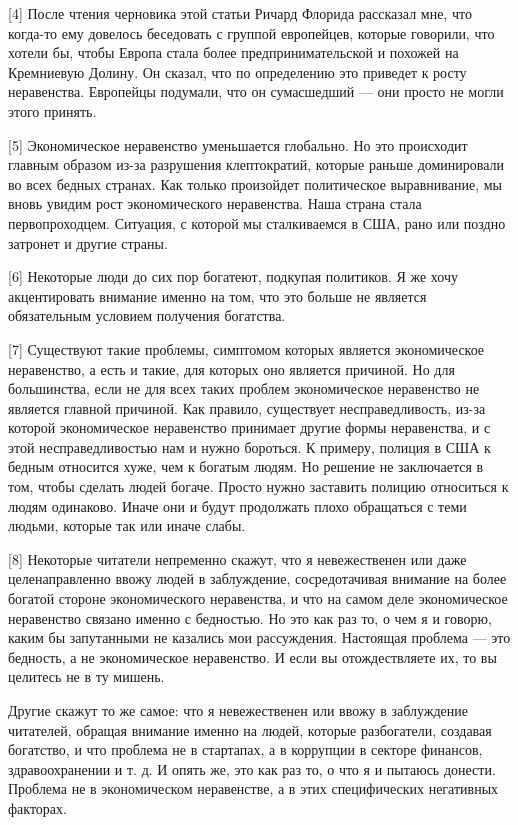 \documentclass[ebook,12pt,oneside,openany]{memoir}
\begin{document}
[4] После чтения черновика этой статьи Ричард Флорида рассказал мне,
что когда-то ему довелось беседовать с группой европейцев, которые
говорили, что хотели бы, чтобы Европа стала более предпринимательской
и похожей на Кремниевую Долину. Он сказал, что по определению это
приведет к росту неравенства. Европейцы подумали, что он сумасшедший —
они просто не могли этого принять.

[5] Экономическое неравенство уменьшается глобально. Но это происходит
главным образом из-за разрушения клептократий, которые раньше
доминировали во всех бедных странах. Как только произойдет
политическое выравнивание, мы вновь увидим рост экономического
неравенства. Наша страна стала первопроходцем. Ситуация, с которой мы
сталкиваемся в США, рано или поздно затронет и другие страны.

[6] Некоторые люди до сих пор богатеют, подкупая политиков. Я же хочу
акцентировать внимание именно на том, что это больше не является
обязательным условием получения богатства.

[7] Существуют такие проблемы, симптомом которых является
экономическое неравенство, а есть и такие, для которых оно является
причиной. Но для большинства, если не для всех таких проблем
экономическое неравенство не является главной причиной. Как правило,
существует несправедливость, из-за которой экономическое неравенство
принимает другие формы неравенства, и с этой несправедливостью нам и
нужно бороться. К примеру, полиция в США к бедным относится хуже, чем
к богатым людям. Но решение не заключается в том, чтобы сделать людей
богаче. Просто нужно заставить полицию относиться к людям одинаково.
Иначе они и будут продолжать плохо обращаться с теми людьми, которые
так или иначе слабы.

[8] Некоторые читатели непременно скажут, что я невежественен или даже
целенаправленно ввожу людей в заблуждение, сосредотачивая внимание на
более богатой стороне экономического неравенства, и что на самом деле
экономическое неравенство связано именно с бедностью. Но это как раз
то, о чем я и говорю, каким бы запутанными не казались мои
рассуждения. Настоящая проблема — это бедность, а не экономическое
неравенство. И если вы отождествляете их, то вы целитесь не в ту
мишень.

Другие скажут то же самое: что я невежественен или ввожу в заблуждение
читателей, обращая внимание именно на людей, которые разбогатели,
создавая богатство, и что проблема не в стартапах, а в коррупции в
секторе финансов, здравоохранении и т. д. И опять же, это как раз то,
о что я и пытаюсь донести. Проблема не в экономическом неравенстве, а
в этих специфических негативных факторах.
\end{document}
